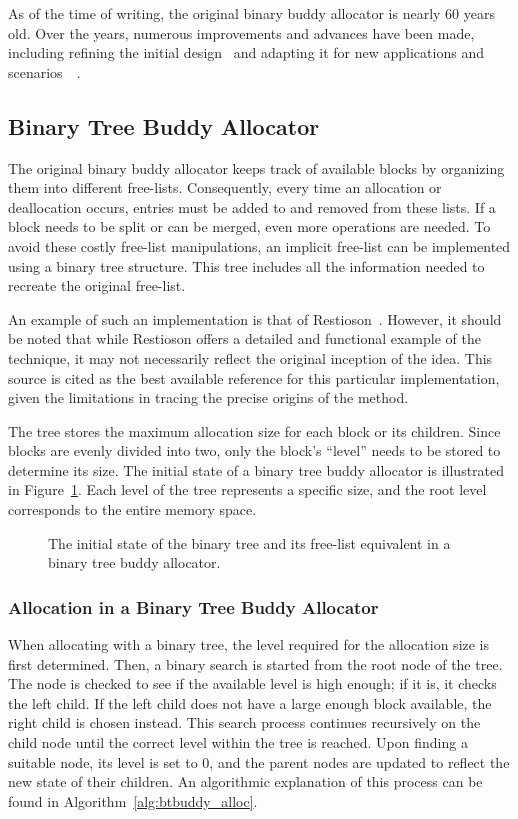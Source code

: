 As of the time of writing, the original binary buddy allocator is nearly 60 years old. Over the years, numerous improvements and advances have been made, including refining the initial design~\cite{genbuddy} and adapting it for new applications and scenarios~\cite{nbbs}~\cite{park2014ibuddy}.

\subsection{Binary Tree Buddy Allocator}
The original binary buddy allocator keeps track of available blocks by organizing them into different free-lists. Consequently, every time an allocation or deallocation occurs, entries must be added to and removed from these lists. If a block needs to be split or can be merged, even more operations are needed. To avoid these costly free-list manipulations, an implicit free-list can be implemented using a binary tree structure. This tree includes all the information needed to recreate the original free-list.

An example of such an implementation is that of Restioson~\cite{btbuddy}. However, it should be noted that while Restioson offers a detailed and functional example of the technique, it may not necessarily reflect the original inception of the idea. This source is cited as the best available reference for this particular implementation, given the limitations in tracing the precise origins of the method.

The tree stores the maximum allocation size for each block or its children. Since blocks are evenly divided into two, only the block's ``level'' needs to be stored to determine its size. The initial state of a binary tree buddy allocator is illustrated in Figure~\ref{fig:btbuddyinitial}. Each level of the tree represents a specific size, and the root level corresponds to the entire memory space.

\begin{figure}[h]
  \centering
  
  \caption{The initial state of the binary tree and its free-list equivalent in a binary tree buddy allocator.}
  \label{fig:btbuddyinitial}
\end{figure}

\subsubsection{Allocation in a Binary Tree Buddy Allocator}
When allocating with a binary tree, the level required for the allocation size is first determined. Then, a binary search is started from the root node of the tree. The node is checked to see if the available level is high enough; if it is, it checks the left child. If the left child does not have a large enough block available, the right child is chosen instead. This search process continues recursively on the child node until the correct level within the tree is reached. Upon finding a suitable node, its level is set to 0, and the parent nodes are updated to reflect the new state of their children. An algorithmic explanation of this process can be found in Algorithm~\ref{alg:btbuddy_alloc}.

